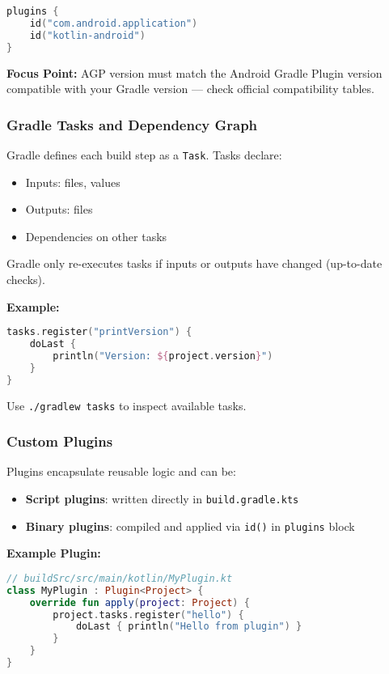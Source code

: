 \documentclass[a4paper,12pt]{article}
\begin{document}
\begin{lstlisting}[language=Kotlin]
plugins {
    id("com.android.application")
    id("kotlin-android")
}
\end{lstlisting}

\textbf{Focus Point:} AGP version must match the Android Gradle Plugin version compatible with your Gradle version — check official compatibility tables.

\subsubsection{Gradle Tasks and Dependency Graph}

Gradle defines each build step as a \texttt{Task}. Tasks declare:

\begin{itemize}
  \item Inputs: files, values
  \item Outputs: files
  \item Dependencies on other tasks
\end{itemize}

Gradle only re-executes tasks if inputs or outputs have changed (up-to-date checks).

\textbf{Example:}

\begin{lstlisting}[language=Kotlin]
tasks.register("printVersion") {
    doLast {
        println("Version: ${project.version}")
    }
}
\end{lstlisting}

Use \texttt{./gradlew tasks} to inspect available tasks.

\subsubsection{Custom Plugins}

Plugins encapsulate reusable logic and can be:

\begin{itemize}
  \item \textbf{Script plugins}: written directly in \texttt{build.gradle.kts}
  \item \textbf{Binary plugins}: compiled and applied via \texttt{id()} in \texttt{plugins} block
\end{itemize}

\textbf{Example Plugin:}
\begin{lstlisting}[language=Kotlin]
// buildSrc/src/main/kotlin/MyPlugin.kt
class MyPlugin : Plugin<Project> {
    override fun apply(project: Project) {
        project.tasks.register("hello") {
            doLast { println("Hello from plugin") }
        }
    }
}
\end{lstlisting}
\end{document}
